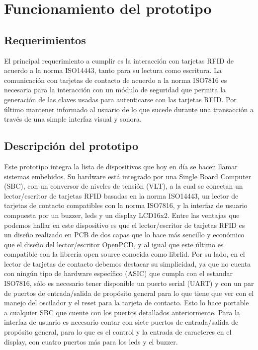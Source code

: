 \chapter{Funcionamiento del prototipo}

\section{Requerimientos}
El principal requerimiento a cumplir es la interacción con tarjetas RFID de acuerdo a la norma ISO14443, tanto para su lectura como escritura.
La comunicación con tarjetas de contacto de acuerdo a la norma ISO7816 es necesaria para la interacción con
un módulo de seguridad que permita la generación de las claves usadas para autenticarse
con las tarjetas RFID.
Por último mantener informado al usuario de lo que sucede durante una transacción
a través de una simple interfaz visual y sonora.


\section{Descripción del prototipo}
Este prototipo integra la lista de dispositivos que hoy en día se hacen llamar sistemas embebidos. Su hardware está integrado por una Single Board Computer (SBC), con un conversor de niveles de tensión (VLT), a la cual se conectan un lector/escritor de tarjetas RFID basadas en la norma ISO14443, un lector de tarjetas de contacto compatibles con la norma ISO7816, y la interfaz de usuario compuesta por un buzzer, leds y un display LCD16x2.
Entre las ventajas que podemos hallar en este dispositivo es que el lector/escritor de tarjetas RFID es un diseño realizado en PCB de dos capas que lo hace más sencillo y económico que el diseño del lector/escritor OpenPCD, y al igual que este último es compatible con la librería open source conocida como librfid.
Por su lado, en el lector de tarjetas de contacto debemos destacar su simplicidad, ya que no cuenta con ningún tipo de hardware específico (ASIC) que cumpla con el estandar ISO7816, sólo es necesario tener disponible un puerto serial (UART) y con un par de puertos de entrada/salida de propósito general para lo que tiene que ver con el manejo del oscilador y el reset para la tarjeta de contacto. Esto lo hace portable a cualquier SBC que cuente con los puertos detallados anteriormente.
Para la interfaz de usuario es necesario contar con siete puertos de entrada/salida de propósito general, para lo que es el control y la entrada de caracteres en el display, con cuatro puertos más para los leds y el buzzer.


